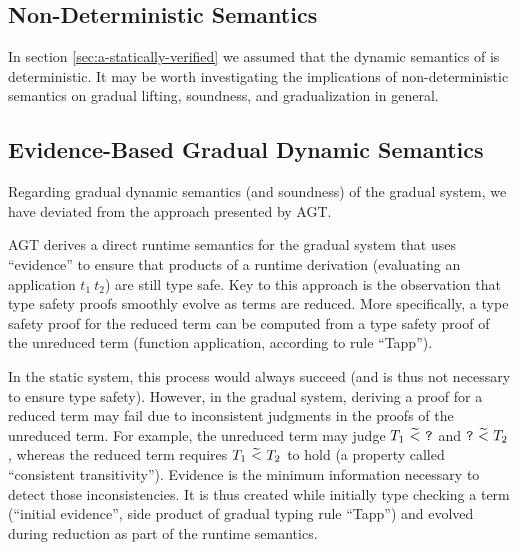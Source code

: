 \subsection{Non-Deterministic Semantics}\label{ssec:nd-semantics}
In section \ref{sec:a-statically-verified} we assumed that the dynamic semantics of \svl is deterministic.
It may be worth investigating the implications of non-deterministic semantics on gradual lifting, soundness, and gradualization in general.

\subsection{Evidence-Based Gradual Dynamic Semantics}\label{ssec:ev-based-gds}
Regarding gradual dynamic semantics (and soundness) of the gradual system, we have deviated from the approach presented by AGT.

AGT derives a direct runtime semantics for the gradual system that uses “evidence” to ensure that products of a runtime derivation (evaluating an application $t_1~t_2$) are still type safe.
Key to this approach is the observation that type safety proofs smoothly evolve as terms are reduced.
More specifically, a type safety proof for the reduced term can be computed from a type safety proof of the unreduced term (function application, according to rule “Tapp”).

In the static system, this process would always succeed (and is thus not necessary to ensure type safety).
However, in the gradual system, deriving a proof for a reduced term may fail due to inconsistent judgments in the proofs of the unreduced term.
For example, the unreduced term may judge $T_1~\widetilde{<}~\textup{\texttt{?}}$ and $\textup{\texttt{?}}~\widetilde{<}~T_2$, whereas the reduced term requires $T_1~\widetilde{<}~T_2$ to hold (a property called “consistent transitivity”).
Evidence is the minimum information necessary to detect those inconsistencies.
It is thus created while initially type checking a term (“initial evidence”, side product of gradual typing rule “\gradT Tapp”) and evolved during reduction as part of the runtime semantics.


